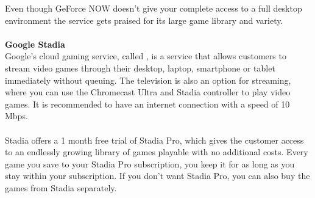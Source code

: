 Even though GeForce NOW doesn't give your complete access to a full desktop environment the service gets praised for its large game library and variety.\\\\
\textbf{Google Stadia}\\
Google's cloud gaming service, called , is a service that allows customers to stream video games through their desktop, laptop, smartphone or tablet immediately without queuing. The television is also an option for streaming, where you can use the Chromecast Ultra and Stadia controller to play video games. It is recommended to have an internet connection with a speed of 10 Mbps.\\\\
Stadia offers a 1 month free trial of Stadia Pro, which gives the customer access to an endlessly growing library of games playable with no additional costs. Every game you save to your Stadia Pro subscription, you keep it for as long as you stay within your subscription. If you don't want Stadia Pro, you can also buy the games from Stadia separately.\\\\